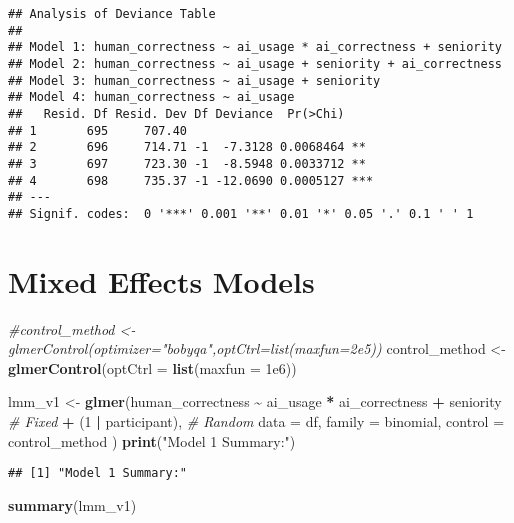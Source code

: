 \documentclass[
]{article}
\newenvironment{Shaded}{\begin{snugshade}}{\end{snugshade}}
\newcommand{\AttributeTok}[1]{\textcolor[rgb]{0.13,0.29,0.53}{#1}}
\newcommand{\CommentTok}[1]{\textcolor[rgb]{0.56,0.35,0.01}{\textit{#1}}}
\newcommand{\DecValTok}[1]{\textcolor[rgb]{0.00,0.00,0.81}{#1}}
\newcommand{\FloatTok}[1]{\textcolor[rgb]{0.00,0.00,0.81}{#1}}
\newcommand{\FunctionTok}[1]{\textcolor[rgb]{0.13,0.29,0.53}{\textbf{#1}}}
\newcommand{\NormalTok}[1]{#1}
\newcommand{\OtherTok}[1]{\textcolor[rgb]{0.56,0.35,0.01}{#1}}
\newcommand{\SpecialCharTok}[1]{\textcolor[rgb]{0.81,0.36,0.00}{\textbf{#1}}}
\newcommand{\StringTok}[1]{\textcolor[rgb]{0.31,0.60,0.02}{#1}}
\begin{document}
\begin{verbatim}
## Analysis of Deviance Table
## 
## Model 1: human_correctness ~ ai_usage * ai_correctness + seniority
## Model 2: human_correctness ~ ai_usage + seniority + ai_correctness
## Model 3: human_correctness ~ ai_usage + seniority
## Model 4: human_correctness ~ ai_usage
##   Resid. Df Resid. Dev Df Deviance  Pr(>Chi)    
## 1       695     707.40                          
## 2       696     714.71 -1  -7.3128 0.0068464 ** 
## 3       697     723.30 -1  -8.5948 0.0033712 ** 
## 4       698     735.37 -1 -12.0690 0.0005127 ***
## ---
## Signif. codes:  0 '***' 0.001 '**' 0.01 '*' 0.05 '.' 0.1 ' ' 1
\end{verbatim}

\hypertarget{mixed-effects-models}{%
\section{Mixed Effects Models}\label{mixed-effects-models}}

\begin{Shaded}
\begin{Highlighting}[]
\CommentTok{\#control\_method \textless{}{-} glmerControl(optimizer="bobyqa",optCtrl=list(maxfun=2e5))}
\NormalTok{control\_method }\OtherTok{\textless{}{-}} \FunctionTok{glmerControl}\NormalTok{(}\AttributeTok{optCtrl =} \FunctionTok{list}\NormalTok{(}\AttributeTok{maxfun =} \FloatTok{1e6}\NormalTok{))}

\NormalTok{lmm\_v1 }\OtherTok{\textless{}{-}} \FunctionTok{glmer}\NormalTok{(human\_correctness }\SpecialCharTok{\textasciitilde{}}\NormalTok{ ai\_usage }\SpecialCharTok{*}\NormalTok{ ai\_correctness }\SpecialCharTok{+}\NormalTok{ seniority }\CommentTok{\# Fixed}
                \SpecialCharTok{+}\NormalTok{ (}\DecValTok{1} \SpecialCharTok{|}\NormalTok{ participant), }\CommentTok{\# Random}
                \AttributeTok{data =}\NormalTok{ df, }\AttributeTok{family =}\NormalTok{ binomial,}
                \AttributeTok{control =}\NormalTok{ control\_method}
\NormalTok{                )}
\FunctionTok{print}\NormalTok{(}\StringTok{"Model 1 Summary:"}\NormalTok{)}
\end{Highlighting}
\end{Shaded}

\begin{verbatim}
## [1] "Model 1 Summary:"
\end{verbatim}

\begin{Shaded}
\begin{Highlighting}[]
\FunctionTok{summary}\NormalTok{(lmm\_v1)}
\end{Highlighting}
\end{Shaded}
\end{document}
